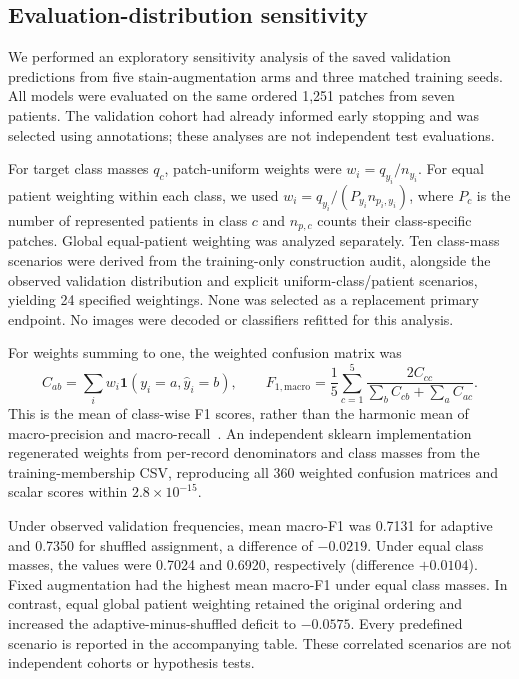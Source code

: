 \subsection{Evaluation-distribution sensitivity}
We performed an exploratory sensitivity analysis of the saved validation
predictions from five stain-augmentation arms and three matched training seeds.
All models were evaluated on the same ordered 1,251 patches from seven patients.
The validation cohort had already informed early stopping and was selected using
annotations; these analyses are not independent test evaluations.

For target class masses $q_c$, patch-uniform weights were
$w_i=q_{y_i}/n_{y_i}$. For equal patient weighting within each class, we used
$w_i=q_{y_i}/(P_{y_i}n_{p_i,y_i})$, where $P_c$ is the number of represented
patients in class $c$ and $n_{p,c}$ counts their class-specific patches.
Global equal-patient weighting was analyzed separately. Ten class-mass scenarios
were derived from the training-only construction audit, alongside the observed
validation distribution and explicit uniform-class/patient scenarios, yielding
24 specified weightings. None was selected as a replacement primary endpoint.
No images were decoded or classifiers refitted for this analysis.

For weights summing to one, the weighted confusion matrix was
\begin{equation}
 C_{ab}=\sum_i w_i\mathbf{1}(y_i=a,\hat y_i=b),\qquad
 F_{1,\mathrm{macro}}=\frac{1}{5}\sum_{c=1}^5
 \frac{2C_{cc}}{\sum_b C_{cb}+\sum_a C_{ac}}.
\end{equation}
This is the mean of class-wise F1 scores, rather than the harmonic mean of
macro-precision and macro-recall~\cite{opitz2019macrof1}.
An independent sklearn implementation regenerated weights from per-record
denominators and class masses from the training-membership CSV, reproducing all
360 weighted confusion matrices and scalar scores within $2.8\times10^{-15}$.

Under observed validation frequencies, mean macro-F1 was 0.7131 for adaptive and
0.7350 for shuffled assignment, a difference of $-0.0219$.
Under equal class masses, the values were 0.7024 and 0.6920, respectively
(difference $+0.0104$). Fixed augmentation had the highest mean macro-F1 under
equal class masses. In contrast, equal global patient weighting retained the
original ordering and increased the adaptive-minus-shuffled deficit to
$-0.0575$. Every predefined scenario is reported in the accompanying table.
These correlated scenarios are not independent cohorts or hypothesis tests.

